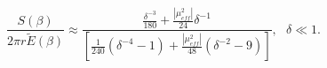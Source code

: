 \begin{equation}
\frac{S\left(\beta \right)}{2\pi r\widetilde{E}\left(\beta \right)}\approx \frac{\frac{\delta ^{-3}}{180}+\frac{\left|\mu _{eff}^{2}\right|}{24}\delta ^{-1}}{\left[\frac{1}{240}\left(\delta ^{-4}-1\right)+\frac{\left|\mu _{eff}^{2}\right|}{48}\left(\delta ^{-2}-9\right)\right]},\, \, \, \, \delta \ll 1.\label{ratio two}\end{equation}

